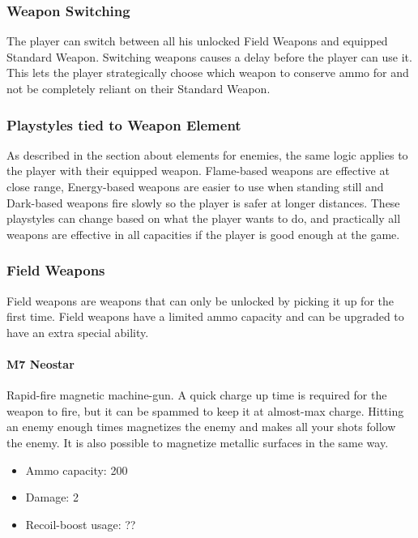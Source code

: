 \documentclass[12pt]{article}
\begin{document}
\subsubsection{Weapon Switching}

The player can switch between all his unlocked Field Weapons and equipped Standard Weapon. Switching weapons causes a delay before the player can use it. This lets the player strategically choose which weapon to conserve ammo for and not be completely reliant on their Standard Weapon. 

\subsubsection{Playstyles tied to Weapon Element}

As described in the section about elements for enemies, the same logic applies to the player with their equipped weapon. Flame-based  weapons are effective at close range, Energy-based weapons are easier to use when standing still and Dark-based weapons fire slowly so the player is safer at longer distances. These playstyles can change based on what the player wants to do, and practically all weapons are effective in all capacities if the player is good enough at the game. 

\subsubsection{Field Weapons}

Field weapons are weapons that can only be unlocked by picking it up for the first time. Field weapons have a limited ammo capacity and can be upgraded to have an extra special ability.

\paragraph{M7 Neostar}

Rapid-fire magnetic machine-gun. A quick charge up time is required for the weapon to fire, but it can be spammed to keep it at almost-max charge. Hitting an enemy enough times magnetizes the enemy and makes all your shots follow the enemy. It is also possible to magnetize metallic surfaces in the same way.

\begin{itemize}
	\item Ammo capacity: 200
	\item Damage: 2
	\item Recoil-boost usage: ??
\end{itemize}
\end{document}
